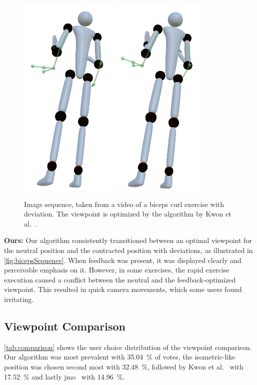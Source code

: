 \begin{figure}[h!]
	\includegraphics[width=0.12\linewidth]{pictures/kwonSequence7.png}\hfill
	\includegraphics[width=0.115\linewidth]{pictures/kwonSequence8.png}\hfill
	\caption[Image sequence optimized by Kwon et al.~\cite{kwon2020ocp}.]{Image sequence, taken from a video of a biceps curl exercise with deviation. The viewpoint is optimized by the algorithm by Kwon et al.~\cite{kwon2020ocp}.}
	\label{fig:kwonSequence}
\end{figure}

\textbf{Ours:}
Our algorithm consistently transitioned between an optimal viewpoint for the neutral position and the contracted position with deviations, as illustrated in \autoref{fig:bicepsSequence}. When feedback was present, it was displayed clearly and perceivable emphasis on it. However, in some exercises, the rapid exercise execution caused a conflict between the neutral and the feedback-optimized viewpoint. This resulted in quick camera movements, which some users found irritating.

\subsection{Viewpoint Comparison \label{sec:results:comparison}}
\autoref{tab:comparison} shows the user choice distribution of the viewpoint comparison. Our algorithm was most prevalent with 35.04~\% of votes, the isometric-like position was chosen second most with 32.48~\%, followed by Kwon et al.~\cite{kwon2020ocp} with 17.52~\% and lastly \acrshort{jmo}~\cite{ishara2015mra} with 14.96~\%.

